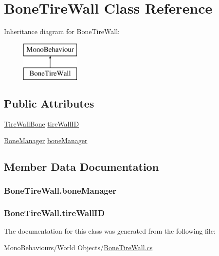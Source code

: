 \hypertarget{class_bone_tire_wall}{}\section{Bone\+Tire\+Wall Class Reference}
\label{class_bone_tire_wall}
Inheritance diagram for Bone\+Tire\+Wall\+:\begin{figure}[H]
\begin{center}
\leavevmode
\includegraphics[height=2.000000cm]{class_bone_tire_wall}
\end{center}
\end{figure}
\subsection*{Public Attributes}
\begin{DoxyCompactItemize}
\item 
\hyperlink{_bone_tire_wall_8cs_ab24ff2683c539edc61b2c9143d5a99db}{Tire\+Wall\+Bone} \hyperlink{class_bone_tire_wall_a8f412f7164991dde5e743c5b2c15e26c}{tire\+Wall\+ID}
\item 
\hyperlink{class_bone_manager}{Bone\+Manager} \hyperlink{class_bone_tire_wall_acc138c14f418e7b58c450fb12be51de9}{bone\+Manager}
\end{DoxyCompactItemize}


\subsection{Member Data Documentation}
\subsubsection[{\texorpdfstring{bone\+Manager}{boneManager}}]{ Bone\+Tire\+Wall.\+bone\+Manager}\hypertarget{class_bone_tire_wall_acc138c14f418e7b58c450fb12be51de9}{}\label{class_bone_tire_wall_acc138c14f418e7b58c450fb12be51de9}
\subsubsection[{\texorpdfstring{tire\+Wall\+ID}{tireWallID}}]{ Bone\+Tire\+Wall.\+tire\+Wall\+ID}\hypertarget{class_bone_tire_wall_a8f412f7164991dde5e743c5b2c15e26c}{}\label{class_bone_tire_wall_a8f412f7164991dde5e743c5b2c15e26c}


The documentation for this class was generated from the following file\+:\begin{DoxyCompactItemize}
\item 
Mono\+Behaviours/\+World Objects/\hyperlink{_bone_tire_wall_8cs}{Bone\+Tire\+Wall.\+cs}\end{DoxyCompactItemize}
